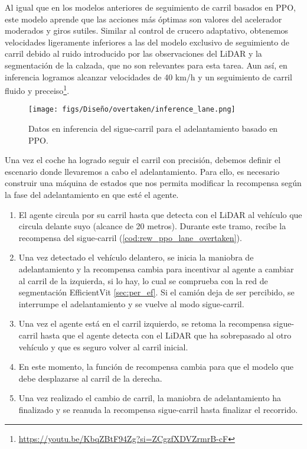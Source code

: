 Al igual que en los modelos anteriores de seguimiento de carril basados en \ac{PPO}, este modelo aprende que las acciones más óptimas son valores del acelerador moderados y giros sutiles. Similar al control de crucero adaptativo, obtenemos velocidades ligeramente inferiores a las del modelo exclusivo de seguimiento de carril debido al ruido introducido por las observaciones del \ac{LiDAR} y la segmentación de la calzada, que no son relevantes para esta tarea. Aun así, en inferencia logramos alcanzar velocidades de 40 km/h y un seguimiento de carril fluido y preceiso\footnote{\url{https://youtu.be/KbqZBtF94Zg?si=ZCgzfXDVZrmrB-cF}}.
\begin{figure}[ht]
\centering
\texttt{[image: figs/Diseño/overtaken/inference\_lane.png]}
\caption{Datos en inferencia del sigue-carril para el adelantamiento basado en \ac{PPO}.}
\label{fig:inference_lane_overtaken}
\end{figure}

Una vez el coche ha logrado seguir el carril con precisión, debemos definir el escenario donde llevaremos a cabo el adelantamiento. Para ello, es necesario construir una máquina de estados que nos permita modificar la recompensa según la fase del adelantamiento en que esté el agente.

\begin{enumerate}
\item El agente circula por su carril hasta que detecta con el \ac{LiDAR} al vehículo que circula delante suyo (alcance de 20 metros). Durante este tramo, recibe la recompensa del sigue-carril (\ref{cod:rew_ppo_lane_overtaken}).
\item Una vez detectado el vehículo delantero, se inicia la maniobra de adelantamiento y la recompensa cambia para incentivar al agente a cambiar al carril de la izquierda, si lo hay, lo cual se comprueba con la red de segmentación EfficientVit \ref{sec:per_ef}. Si el camión deja de ser percibido, se interrumpe el adelantamiento y se vuelve al modo sigue-carril.
\item Una vez el agente está en el carril izquierdo, se retoma la recompensa sigue-carril hasta que el agente detecta con el \ac{LiDAR} que ha sobrepasado al otro vehículo y que es seguro volver al carril inicial.
\item En este momento, la función de recompensa cambia para que el modelo que debe desplazarse al carril de la derecha.
\item Una vez realizado el cambio de carril, la maniobra de adelantamiento ha finalizado y se reanuda la recompensa sigue-carril hasta finalizar el recorrido.
\end{enumerate}

